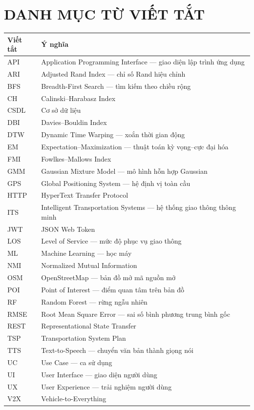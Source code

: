 \documentclass[12pt,a4paper]{report}
\begin{document}
\chapter*{DANH MỤC TỪ VIẾT TẮT}
\begin{table}[h!]
\centering
\begin{tabularx}{\textwidth}{lX}
\toprule
\textbf{Viết tắt} & \textbf{Ý nghĩa}\\
\midrule
API & Application Programming Interface --- giao diện lập trình ứng dụng\\
ARI & Adjusted Rand Index --- chỉ số Rand hiệu chỉnh\\
BFS & Breadth-First Search --- tìm kiếm theo chiều rộng\\
CH & Calinski--Harabasz Index\\
CSDL & Cơ sở dữ liệu\\
DBI & Davies--Bouldin Index\\
DTW & Dynamic Time Warping --- xoắn thời gian động\\
EM & Expectation--Maximization --- thuật toán kỳ vọng--cực đại hóa\\
FMI & Fowlkes--Mallows Index\\
GMM & Gaussian Mixture Model --- mô hình hỗn hợp Gaussian\\
GPS & Global Positioning System --- hệ định vị toàn cầu\\
HTTP & HyperText Transfer Protocol\\
ITS & Intelligent Transportation Systems --- hệ thống giao thông thông minh\\
JWT & JSON Web Token\\
LOS & Level of Service --- mức độ phục vụ giao thông\\
ML & Machine Learning --- học máy\\
NMI & Normalized Mutual Information\\
OSM & OpenStreetMap --- bản đồ mở mã nguồn mở\\
POI & Point of Interest --- điểm quan tâm trên bản đồ\\
RF & Random Forest --- rừng ngẫu nhiên\\
RMSE & Root Mean Square Error --- sai số bình phương trung bình gốc\\
REST & Representational State Transfer\\
TSP & Transportation System Plan\\
TTS & Text-to-Speech --- chuyển văn bản thành giọng nói\\
UC & Use Case --- ca sử dụng\\
UI & User Interface --- giao diện người dùng\\
UX & User Experience --- trải nghiệm người dùng\\
V2X & Vehicle-to-Everything\\
\bottomrule
\end{tabularx}
\end{table}
\end{document}
